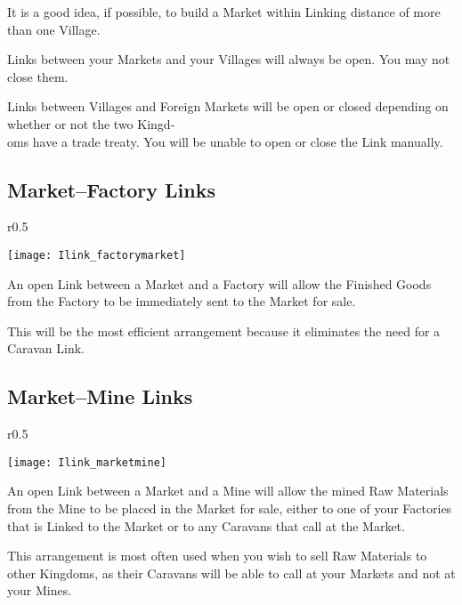 It is a good idea, if possible, to build a Market within Linking distance of more than one Village.

Links between your Markets and your Villages will always be open. You may not close them.

Links between Villages and Foreign Markets will be open or closed depending on whether or not the two Kingd-\\
oms have a trade treaty. You will be unable to open or close the Link manually.

\subsection{Market–Factory Links}

\begin{wrapfigure}{r}{0.5\textwidth}
	\vspace{-20pt}
	\begin{center}
		\texttt{[image: Ilink\_factorymarket]}
	\end{center}
	\vspace{-20pt}
\end{wrapfigure}

An open Link between a Market and a Factory will allow the Finished Goods from the Factory to be immediately sent to the Market for sale.

This will be the most efficient arrangement because it eliminates the need for a Caravan Link.

\subsection{Market–Mine Links}

\begin{wrapfigure}{r}{0.5\textwidth}
	\vspace{-20pt}
	\begin{center}
		\texttt{[image: Ilink\_marketmine]}
	\end{center}
	\vspace{-20pt}
\end{wrapfigure}

An open Link between a Market and a Mine will allow the mined Raw Materials from the Mine to be placed in the Market for sale, either to one of your Factories that is Linked to the Market or to any Caravans that call at the Market.

This arrangement is most often used when you wish to sell Raw Materials to other Kingdoms, as their Caravans will be able to call at your Markets and not at your Mines.

